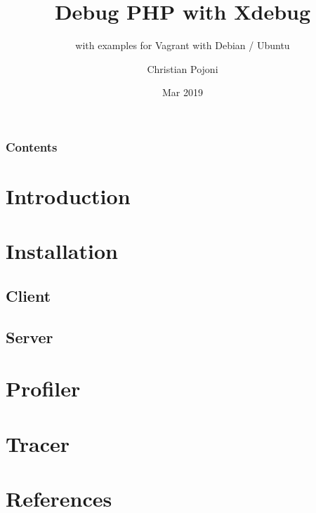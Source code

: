\documentclass[
    hyperref={bookmarks=true}
]{beamer}
\title{Debug PHP with Xdebug}
\subtitle{with examples for Vagrant with Debian / Ubuntu}
\author{Christian Pojoni}
\institute{\url{www.secret-source.eu}}
\date{Mar 2019}
\begin{document}
\frame{\titlepage}
\begin{frame}\frametitle{Contents}
    \tableofcontents
\end{frame}

\section{Introduction}


\section{Installation} 
\subsection{Client}


\subsection{Server}


\section{Profiler}


\section{Tracer}


\section{References}

\end{document}
